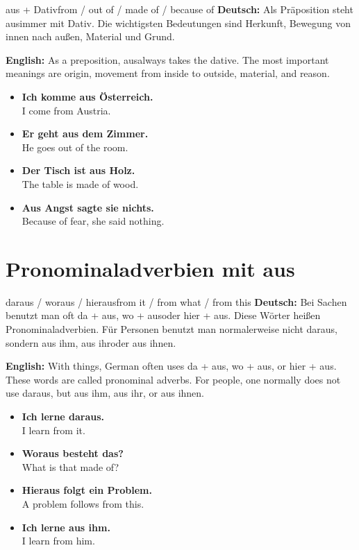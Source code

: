 \documentclass[a4paper,11pt]{article}
\newcommand{\GermanText}[1]{\textbf{Deutsch: }#1\par}
\newcommand{\EnglishText}[1]{{\small\color{SoftGray}\textbf{English: }#1\par}}
\newcommand{\ExampleItem}[2]{\item \textbf{#1}\\{\small\color{SoftGray}#2}}
\begin{document}
\begin{grammarentry}{aus + Dativ}{from / out of / made of / because of}
\GermanText{Als Präposition steht \glqq aus\grqq immer mit Dativ. Die wichtigsten Bedeutungen sind Herkunft, Bewegung von innen nach außen, Material und Grund.}
\EnglishText{As a preposition, \glqq aus\grqq always takes the dative. The most important meanings are origin, movement from inside to outside, material, and reason.}

\begin{exbox}
\begin{itemize}
    \ExampleItem{Ich komme aus Österreich.}{I come from Austria.}
    \ExampleItem{Er geht aus dem Zimmer.}{He goes out of the room.}
    \ExampleItem{Der Tisch ist aus Holz.}{The table is made of wood.}
    \ExampleItem{Aus Angst sagte sie nichts.}{Because of fear, she said nothing.}
\end{itemize}
\end{exbox}
\end{grammarentry}

\section{Pronominaladverbien mit aus}

\begin{grammarentry}{daraus / woraus / hieraus}{from it / from what / from this}
\GermanText{Bei Sachen benutzt man oft \glqq da + aus\grqq, \glqq wo + aus\grqq oder \glqq hier + aus\grqq. Diese Wörter heißen Pronominaladverbien. Für Personen benutzt man normalerweise nicht \glqq daraus\grqq, sondern \glqq aus ihm\grqq, \glqq aus ihr\grqq oder \glqq aus ihnen\grqq.}
\EnglishText{With things, German often uses \glqq da + aus\grqq, \glqq wo + aus\grqq, or \glqq hier + aus\grqq. These words are called pronominal adverbs. For people, one normally does not use \glqq daraus\grqq, but \glqq aus ihm\grqq, \glqq aus ihr\grqq, or \glqq aus ihnen\grqq.}

\begin{exbox}
\begin{itemize}
    \ExampleItem{Ich lerne daraus.}{I learn from it.}
    \ExampleItem{Woraus besteht das?}{What is that made of?}
    \ExampleItem{Hieraus folgt ein Problem.}{A problem follows from this.}
    \ExampleItem{Ich lerne aus ihm.}{I learn from him.}
\end{itemize}
\end{exbox}
\end{grammarentry}
\end{document}
